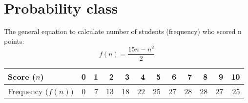 \documentclass[12pt]{article}
\begin{document}
\section*{Probability class}
The general equation to calculate number of students (frequency) who scored n points: $$f(n)=\frac{15n-n^2}{2}$$ \par
    \begin{center}
    \begin{tabular}{l | c*{10}r}
        Score ($n$) & 0 & 1 & 2 & 3 & 4 & 5 & 6 & 7 & 8 & 9 & 10 \\
        \hline
        Frequency ($f(n)$)
        &0 &7 &13 &18 &22 &25 &27 &28 &28 &27 &25 \\
    \end{tabular}
\end{center}

\end{document}
